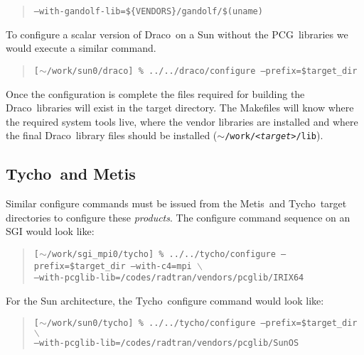 \documentclass[11pt]{nmemo}
\newcommand{\comp}[1]{\normalfont\footnotesize\texttt{#1}\normalsize}
\newcommand{\draco}{{\normalfont\sffamily Draco}}
\newcommand{\tycho}{{\normalfont\sffamily Tycho}}
\newcommand{\metis}{{\normalfont\sffamily Metis}}
\newcommand{\pcg}{{\normalfont\sffamily PCG}}
\begin{document}
\footnotesize
\begin{verse}
\texttt{--with-gandolf-lib=\$\{VENDORS\}/gandolf/\$(uname)}
\end{verse}
\normalsize

To configure a scalar version of \draco\ on a Sun without the \pcg\ 
libraries we would execute a similar command.

\footnotesize
\begin{verse}
\texttt{[$\sim$/work/sun0/draco] \% ../../draco/configure --prefix=\${target\_dir} }\\
\end{verse}
\normalsize

Once the configuration is complete the files required for building the 
\draco\ libraries will exist in the target directory.  The Makefiles
will know where the required system tools live, where the vendor
libraries are installed and where the final \draco\ library files
should be installed (\comp{$\sim$/work/<\emph{target}>/lib}).

\subsection{\tycho\ and \metis}

Similar configure commands must be issued from the \metis\ and \tycho\ 
target directories to configure these \emph{products}.  The configure
command sequence on an SGI would look like:

\footnotesize
\begin{verse}
\texttt{[$\sim$/work/sgi\_mpi0/tycho] \% ../../tycho/configure
--prefix=\${target\_dir} --with-c4=mpi $\backslash$\\
\hspace{0.5in}--with-pcglib-lib=/codes/radtran/vendors/pcglib/IRIX64}
\end{verse}
\normalsize

For the Sun architecture, the \tycho\ configure command would look
like:

\footnotesize
\begin{verse}
\texttt{[$\sim$/work/sun0/tycho] \% ../../tycho/configure 
--prefix=\${target\_dir} $\backslash$\\
\hspace{0.5in}--with-pcglib-lib=/codes/radtran/vendors/pcglib/SunOS}
\end{verse}
\normalsize
\end{document}
